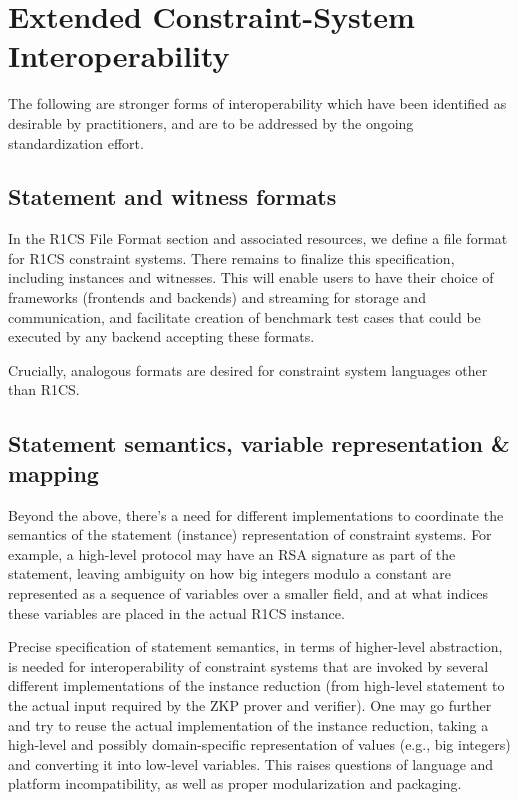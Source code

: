 \section{Extended Constraint-System Interoperability}

The following are stronger forms of interoperability which have been identified as desirable by practitioners, and are to be addressed by the ongoing standardization effort.


\subsection{Statement and witness formats}
In the R1CS File Format section and associated resources, we define a file format for R1CS constraint systems. There remains to finalize this specification, including instances and witnesses. This will enable users to have their choice of frameworks (frontends and backends) and streaming for storage and communication, and facilitate creation of benchmark test cases that could be executed by any backend accepting these formats.
 
Crucially, analogous formats are desired for constraint system languages other than R1CS.


\subsection{Statement semantics, variable representation \& mapping}

Beyond the above, there’s a need for different implementations to coordinate the semantics of the statement (instance) representation of constraint systems. For example, a high-level protocol may have an RSA signature as part of the statement, leaving ambiguity on how big integers modulo a constant are represented as a sequence of variables over a smaller field, and at what indices these variables are placed in the actual R1CS instance.

Precise specification of statement semantics, in terms of higher-level abstraction, is needed for interoperability of constraint systems that are invoked by several different implementations of the instance reduction (from high-level statement to the actual input required by the ZKP prover and verifier). One may go further and try to reuse the actual implementation of the instance reduction, taking a high-level and possibly domain-specific representation of values (e.g., big  integers) and converting it into low-level variables. This raises questions of language and platform incompatibility, as well as proper modularization and packaging.

